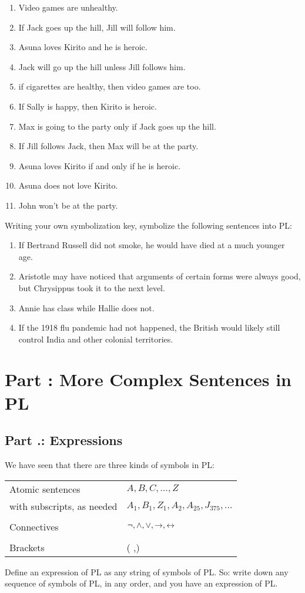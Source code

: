\begin{enumerate}
\item Video games are unhealthy.
\item If Jack goes up the hill, Jill will follow him.
\item Asuna loves Kirito and he is heroic. 
\item Jack will go up the hill unless Jill follows him.
\item if cigarettes are healthy, then video games are too. 
\item If Sally is happy, then Kirito is heroic. 
\item Max is going to the party only if Jack goes up the hill.
\item If Jill follows Jack, then Max will be at the party.
\item Asuna loves Kirito if and only if he is heroic.
\item Asuna does not love Kirito.
\item John won't be at the party. 
\end{enumerate}
\problempart
Writing your own symbolization key, symbolize the following sentences into PL:
\begin{enumerate}
\item If Bertrand Russell did not smoke, he would have died at a much younger age.
\item Aristotle may have noticed that arguments of certain forms were always good, but Chrysippus took it to the next level.
\item Annie has class while Hallie does not.
\item If the 1918 flu pandemic had not happened, the British would likely still control India and other colonial territories. 
\end{enumerate}
\setcounter{seccount}{1}
\chapter{Part \thechapcount: More Complex Sentences in PL}
\section{Part \thechapcount.\theseccount: Expressions}
\label{s:Part 6.1: Expressions}
We have seen that there are three kinds of symbols in PL:
\begin{center}
\begin{tabular}{l l}
Atomic sentences & $A,B,C,\ldots,Z$\\
with subscripts, as needed & $A_1, B_1,Z_1,A_2,A_{25},J_{375},\ldots$\\
\\
Connectives & $\neg,\wedge,\vee,\rightarrow,\leftrightarrow$\\
\\
Brackets &( ,)\\
\end{tabular}
\end{center}
Define an expression of PL as any string of symbols of PL. So: write down any sequence of symbols of PL, in any order, and you have an expression of PL.

